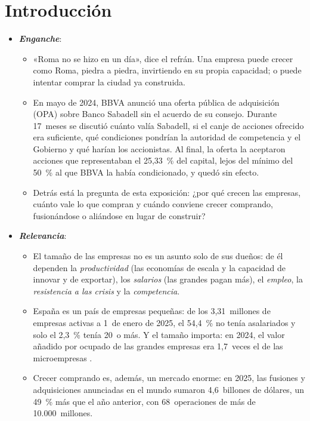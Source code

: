 \documentclass[11pt]{article}
\begin{document}
\tceetitulo

\section*{Introducción}

\begin{itemize}
\item \textbf{\emph{Enganche}}:
  \begin{itemize}
  \item «Roma no se hizo en un día», dice el refrán. Una empresa puede crecer como Roma, piedra a piedra, invirtiendo en su propia capacidad; o puede intentar comprar la ciudad ya construida.
  \item En mayo de 2024, BBVA anunció una oferta pública de adquisición (OPA) sobre Banco Sabadell sin el acuerdo de su consejo. Durante 17~meses se discutió cuánto valía Sabadell, si el canje de acciones ofrecido era suficiente, qué condiciones pondrían la autoridad de competencia y el Gobierno y qué harían los accionistas. Al final, la oferta la aceptaron acciones que representaban el 25,33~\% del capital, lejos del mínimo del 50~\% al que BBVA la había condicionado, y quedó sin efecto\nocite{CNMV2025ResultadoOPA}.
  \item Detrás está la pregunta de esta exposición: ¿por qué crecen las empresas, cuánto vale lo que compran y cuándo conviene crecer comprando, fusionándose o aliándose en lugar de construir?
  \end{itemize}

\item \textbf{\emph{Relevancia}}:
  \begin{itemize}
  \item El tamaño de las empresas no es un asunto solo de sus dueños: de él dependen la \emph{productividad} (las economías de escala y la capacidad de innovar y de exportar), los \emph{salarios} (las grandes pagan más), el \emph{empleo}, la \emph{resistencia a las crisis} y la \emph{competencia}.
  \item España es un país de empresas pequeñas: de los 3,31~millones de empresas activas a 1~de enero de 2025, el 54,4~\% no tenía asalariados y solo el 2,3~\% tenía 20~o más\nocite{INE2025DIRCE}. Y el tamaño importa: en 2024, el valor añadido por ocupado de las grandes empresas era 1,7~veces el de las microempresas\nocite{Eurostat2026SBS} .
  \item Crecer comprando es, además, un mercado enorme: en 2025, las fusiones y adquisiciones anunciadas en el mundo sumaron 4,6~billones de dólares, un 49~\% más que el año anterior, con 68~operaciones de más de 10.000~millones\nocite{LSEG2026MA}.
  \end{itemize}


\end{itemize}
\end{document}
